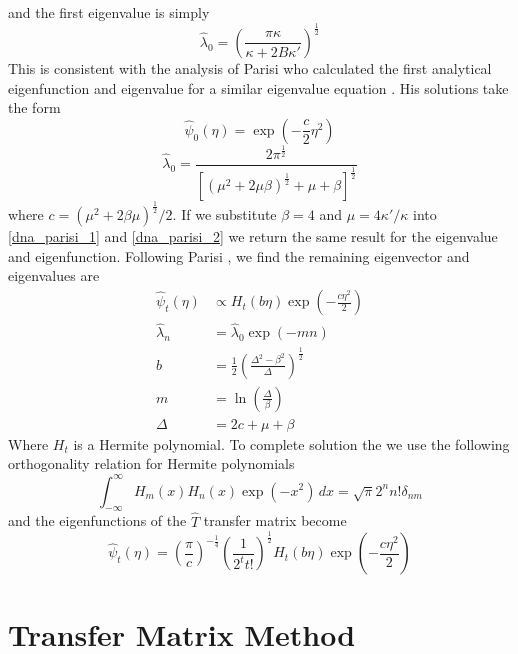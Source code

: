 %
and the first eigenvalue is simply
%
\begin{equation}
\hat{\lambda}_{0}=\left(\frac{\pi\kappa}{\kappa+2B\kappa'}\right)^{\frac{1}{2}}
\end{equation}
%
This is consistent with the analysis of Parisi who calculated the first analytical eigenfunction and eigenvalue for a similar eigenvalue equation \cite{Parisi1998}. His solutions take the form 
%
\begin{equation}
\label{dna_parisi_1}
\hat{\psi}_{0}\left(\eta\right)=\exp\left(-\frac{c}{2}\eta^{2}\right)
\end{equation}
%
\begin{equation}
\label{dna_parisi_2}
\hat{\lambda}_{0}=\frac{2\pi^{\frac{1}{2}}}{[\left(\mu^{2} + 2 \mu \beta\right)^{\frac{1}{2}}+\mu+\beta]^{\frac{1}{2}}}
\end{equation}
%
where $c=\left(\mu^{2}+2\beta\mu\right)^{\frac{1}{2}}/2$.  If we substitute $\beta=4$ and $\mu=4\kappa'/\kappa$ into \eqref{dna_parisi_1} and \eqref{dna_parisi_2} we return the same result for the eigenvalue and eigenfunction. Following Parisi  \cite{Parisi1998}, we find the remaining eigenvector and eigenvalues are
%
\begin{align}
\hat{\psi}_{t}\left(\eta\right)  &\propto H_{t}\left(b\eta\right)\exp\left(-\frac{c \eta^{2}}{2}\right) \\
\hat{\lambda}_{n}&=\hat{\lambda}_{0}\exp\left(-mn\right)\nonumber\\
b&=\frac{1}{2}\left(\frac{\Delta^{2}-\beta^{2}}{\Delta}\right)^{\frac{1}{2}}\nonumber\\
m&=\ln\left(\frac{\Delta}{\beta}\right)\nonumber\\
\Delta&=2c+\mu+\beta\nonumber
\end{align}
Where $H_{t}$ is a Hermite polynomial. To complete solution the we use the following orthogonality relation for Hermite polynomials
%
\begin{equation}
\int^{\infty}_{-\infty}H_{m}\left(x\right)H_{n}\left(x\right)\exp\left(-x^{2}\right)\,dx=\sqrt{\pi}2^{n}n!\delta_{nm}
\end{equation}
%
and the eigenfunctions of the $\hat{T}$ transfer matrix become
%
\begin{equation}\label{dna_t00_efunc}
\hat{\psi}_{t}\left(\eta\right)  = \left(\frac{\pi}{c}\right)^{-\frac{1}{4}}\left(\frac{1}{2^{t}t!}\right)^{\frac{1}{2}}H_{t}\left(b\eta\right)\exp\left(-\frac{c \eta^{2}}{2}\right)
\end{equation}
%
\section{Transfer Matrix Method}

